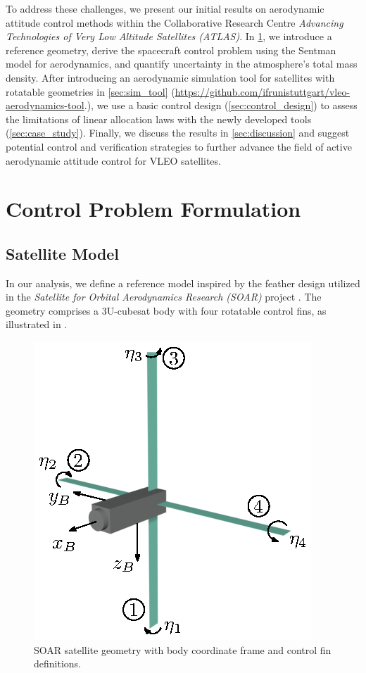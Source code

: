 \documentclass[pdflatex,sn-mathphys-num]{sn-jnl}%
\theoremstyle{thmstyleone}%
\theoremstyle{thmstyletwo}%
\theoremstyle{thmstylethree}%
\begin{document}
	To address these challenges, we present our initial results on aerodynamic attitude control methods within the Collaborative Research Centre \textit{Advancing Technologies of Very Low Altitude Satellites (ATLAS)}. In \cref{sec:control_problem}, we introduce a reference geometry, derive the spacecraft control problem using the Sentman model for aerodynamics, and quantify uncertainty in the atmosphere's total mass density. After introducing an aerodynamic simulation tool for satellites with rotatable geometries in \cref{sec:sim_tool} (\url{https://github.com/ifrunistuttgart/vleo-aerodynamics-tool}.), we use a basic control design (\cref{sec:control_design}) to assess the limitations of linear allocation laws with the newly developed tools (\cref{sec:case_study}). Finally, we discuss the results in \cref{sec:discussion} and suggest potential control and verification strategies to further advance the field of active aerodynamic attitude control for VLEO satellites.


    \section{Control Problem Formulation}
	\label{sec:control_problem}
		\subsection{Satellite Model}
		In our analysis, we define a reference model inspired by the feather design utilized in the \textit{Satellite for Orbital Aerodynamics Research (SOAR)} project \cite{crispSOARSatelliteOrbital}. The geometry comprises a 3U-cubesat body with four rotatable control fins, as illustrated in .

    \begin{figure}[h]
			\centering
			\includegraphics[scale=1]{Figures/fig1.eps}
			\caption{SOAR satellite geometry with body coordinate frame and control fin definitions.}
			\label{fig:satellite}
	\end{figure}
\end{document}
